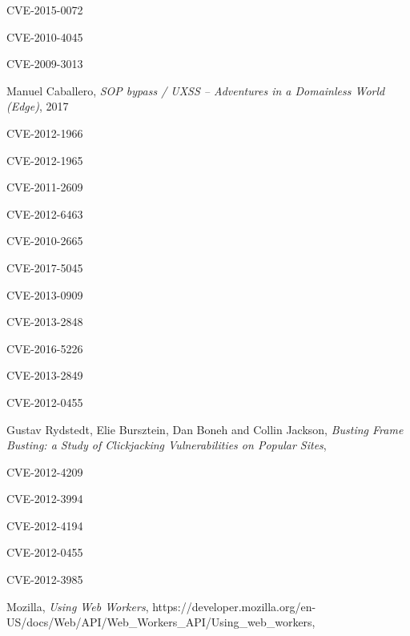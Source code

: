\documentclass[journal]{IEEEtran}
\begin{document}
\begin{thebibliography}{1}
CVE-2015-0072

CVE-2010-4045

CVE-2009-3013

Manuel Caballero,
\textit{SOP bypass / UXSS – Adventures in a Domainless World (Edge)},
2017

CVE-2012-1966

CVE-2012-1965

CVE-2011-2609

CVE-2012-6463

CVE-2010-2665

CVE-2017-5045

CVE-2013-0909

CVE-2013-2848

CVE-2016-5226

CVE-2013-2849

CVE-2012-0455

Gustav Rydstedt, Elie Bursztein, Dan Boneh and Collin Jackson,
\textit{Busting Frame Busting:
a Study of Clickjacking Vulnerabilities on Popular Sites},

CVE-2012-4209

CVE-2012-3994

CVE-2012-4194

CVE-2012-0455

CVE-2012-3985

Mozilla,
\textit{Using Web Workers},
https://developer.mozilla.org/en-US/docs/Web/API/Web\_Workers\_API/Using\_web\_workers,


\end{thebibliography}

\ifCLASSOPTIONcaptionsoff
  \newpage
\fi



\end{document}
